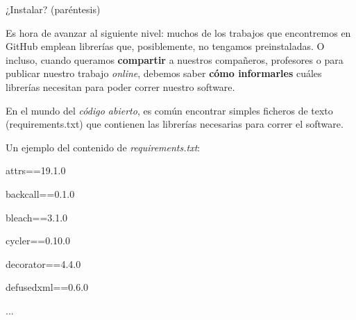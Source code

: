 \begin{frame}[t]{¿Instalar? (par\'entesis)}\vspace{0pt}

Es hora de avanzar al siguiente nivel: muchos de los trabajos que encontremos en GitHub emplean librer\'ias que, posiblemente, no tengamos preinstaladas. O incluso, cuando queramos \textbf{compartir} a nuestros compañeros, profesores o para publicar nuestro trabajo \textit{online}, debemos saber \textbf{c\'omo informarles} cu\'ales librer\'ias necesitan para poder correr nuestro software.

\vspace{5pt}

En el mundo del \textit{c\'odigo abierto}, es com\'un encontrar simples ficheros de texto (requirements.txt) que contienen las librer\'ias necesarias para correr el software.

\vspace{5pt}

Un ejemplo del contenido de \textit{requirements.txt}:

attrs==19.1.0

backcall==0.1.0

bleach==3.1.0

cycler==0.10.0

decorator==4.4.0

defusedxml==0.6.0

...


\end{frame}